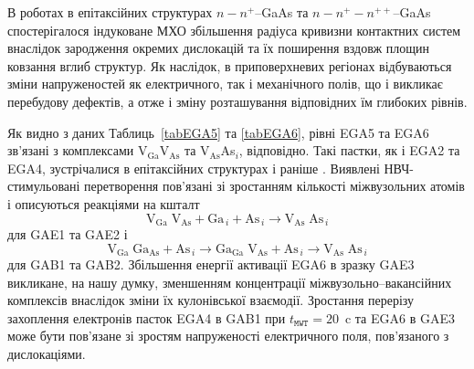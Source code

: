 \documentclass[a4paper,14pt,oneside,openany]{memoir}
\begin{document}
В роботах \cite{Boltovets,Konakova2012FTP} в епітаксійних структурах $n-n^+$--GaAs та $n-n^+-n^{++}$--GaAs спостерігалося індуковане МХО збільшення радіуса кривизни контактних систем внаслідок зародження окремих дислокацій та їх поширення вздовж площин ковзання вглиб структур.
Як наслідок, в приповерхневих регіонах відбуваються зміни напруженостей як електричного, так і механічного полів,
що і викликає перебудову дефектів, а отже і зміну розташування відповідних їм глибоких рівнів.

Як видно з даних Таблиць~\ref{tabEGA5} та \ref{tabEGA6}, рівні EGA5 та EGA6 зв'язані з комплексами V$_\text{Ga}$V$_\text{As}$ та V$_\text{As}$As$_i$, відповідно.
Такі пастки, як і EGA2 та EGA4, зустрічалися в епітаксійних структурах і раніше \cite{Yousefi1995,Mircea1975,Bourgoin:GaAs,ASHBY:GaAs,Fang:EL6,Lefevre1977,KolFTP1989r}.
Виявлені НВЧ-стимульовані перетворення пов'язані зі зростанням кількості міжвузольних атомів і описуються
реакціями на кшталт
\begin{equation*}
  \text{V}_\text{Ga}\;\text{V}_\text{As}+\text{Ga}_{\,i}+\text{As}_{\,i} \rightarrow \text{V}_\text{As}\;\text{As}_{\,i}
\end{equation*}
для GAE1 та GAE2 і
\begin{equation*}
  \text{V}_\text{Ga}\;\text{Ga}_\text{As}+\text{As}_{\,i} \rightarrow
  \text{Ga}_\text{Ga}\;\text{V}_\text{As}+\text{As}_{\,i} \rightarrow
  \text{V}_\text{As}\;\text{As}_{\,i}
\end{equation*}
для GAB1 та GAB2.
Збільшення енергії активації EGA6 в зразку GAE3 викликане, на нашу думку, зменшенням концентрації міжвузольно--вакансійних комплексів внаслідок зміни їх кулонівської взаємодії.
Зростання перерізу захоплення електронів пасток EGA4 в GAB1 при $t_\mathtt{MWT}=20$~c та EGA6 в GAE3 може бути пов'язане зі зростям напруженості електричного поля, пов'язаного з дислокаціями.


\end{document}
